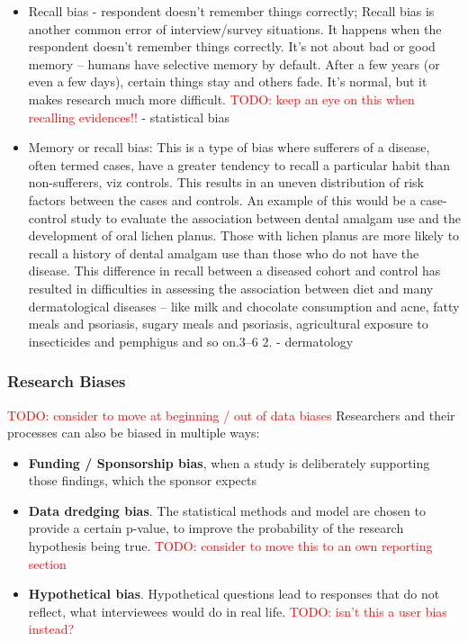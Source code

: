 \documentclass[12pt, a4paper, oneside]{book}   	%
\renewcommand{\todo}[1]{\textcolor{red}{TODO: #1}}
\renewcommand{\paragraph}[1]{%
	\subsubsection*{#1}%
}
\newif\ifrawcitationactive
\newcommand{\rawcitationend}{
	\color{black}\rawcitationactivefalse
}
\newcommand{\rawcitationusedend}{%
	\ifrawcitationactive
	\color{purple}  %
	\else
	\color{black}  %
	\fi
}
\begin{document}
\begin{itemize}
				\item Recall bias - respondent doesn't remember things correctly; Recall bias is another common error of interview/survey situations. It happens when the respondent doesn’t remember things correctly. It’s not about bad or good memory – humans have selective memory by default. After a few years (or even a few days), certain things stay and others fade. It’s normal, but it makes research much more difficult. \todo{keep an eye on this when recalling evidences!!}
				\autocites{Mester_2022}{Mester_2017} - statistical bias
				\item Memory or recall bias: This is a type of bias where sufferers of a disease, often termed cases, have a greater tendency to recall a particular habit than non-sufferers, viz controls. This results in an uneven distribution of risk factors between the cases and controls. An example of this would be a case-control study to evaluate the association between dental amalgam use and the development of oral lichen planus. Those with lichen planus are more likely to recall a history of dental amalgam use than those who do not have the disease. This difference in recall between a diseased cohort and control has resulted in difficulties in assessing the association between diet and many dermatological diseases – like milk and chocolate consumption and acne, fatty meals and psoriasis, sugary meals and psoriasis, agricultural exposure to insecticides and pemphigus and so on.3–6 2. \autocite{Chakraborty_2024} - dermatology
				
				\rawcitationusedend
			\end{itemize}
			\rawcitationend
			
			\paragraph{Research Biases}
			\todo{consider to move at beginning / out of data biases}
			Researchers and their processes can also be biased in multiple ways:
			\begin{itemize}
				\item \textbf{Funding / Sponsorship bias}, when a study is deliberately supporting those findings, which the sponsor expects \autocites{Chakraborty_2024, c22}{Mester_2017}
				
				\item \textbf{Data dredging bias}. The statistical methods and model are chosen to provide a certain p-value, to improve the probability of the research hypothesis being true. \todo{consider to move this to an own reporting section} \autocite{Chakraborty_2024}

				\item \textbf{Hypothetical bias}. Hypothetical questions lead to responses that do not reflect, what interviewees would do in real life. \autocite{Chakraborty_2024, c31, c28} \todo{isn't this a user bias instead?}
			\end{itemize}
			
\end{document}

